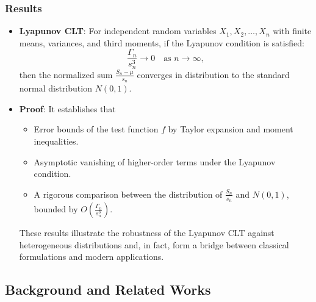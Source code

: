 \subsubsection{Results}
\begin{itemize}
    \item \textbf{Lyapunov CLT}: For independent random variables \(X_1, X_2, \ldots, X_n \) with finite means, variances, and third moments, if the Lyapunov condition is satisfied:
$$
\frac{\Gamma_n}{s_n^3} \to 0 \quad \text{as } n \to \infty,
$$
then the normalized sum \( \frac{S_n - \mu}{s_n} \) converges in distribution to the standard normal distribution \( N(0, 1) \).
    \item \textbf{Proof}: It establishes that
    \begin{itemize}
        \item Error bounds of the test function \(f\) by Taylor expansion and moment inequalities.
        \item Asymptotic vanishing of higher-order terms under the Lyapunov condition.  \item A rigorous comparison between the distribution of \( \frac{S_n}{s_n} \) and \( N(0, 1)\), bounded by \( O\left(\frac{\Gamma_n}{s_n^3}\right) \).
    \end{itemize}

These results illustrate the robustness of the Lyapunov CLT against heterogeneous distributions and, in fact, form a bridge between classical formulations and modern applications.
\end{itemize}

\subsection{Background and Related Works}
